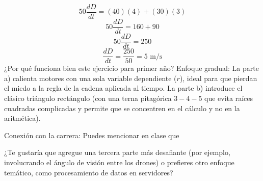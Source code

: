 \documentclass[11pt]{article} %
\begin{document}
$$50 \frac{dD}{dt} = (40)(4) + (30)(3)$$
$$50 \frac{dD}{dt} = 160 + 90$$
$$50 \frac{dD}{dt} = 250$$
$$\frac{dD}{dt} = \frac{250}{50} = 5\text{ m/s}$$
¿Por qué funciona bien este ejercicio para primer año?
Enfoque gradual: La parte a) calienta motores con una sola variable dependiente ($r$), ideal para que pierdan el miedo a la regla de la cadena aplicada al tiempo. La parte b) introduce el clásico triángulo rectángulo (con una terna pitagórica $3-4-5$ que evita raíces cuadradas complicadas y permite que se concentren en el cálculo y no en la aritmética).


Conexión con la carrera: Puedes mencionar en clase que 

¿Te gustaría que agregue una tercera parte más desafiante (por ejemplo, involucrando el ángulo de visión entre los drones) o prefieres otro enfoque temático, como procesamiento de datos en servidores?
\end{document}
